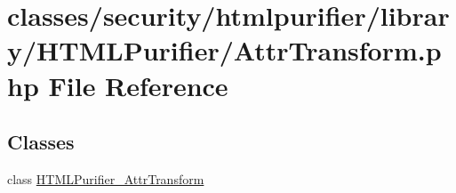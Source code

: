 \hypertarget{AttrTransform_8php}{\section{classes/security/htmlpurifier/library/\+H\+T\+M\+L\+Purifier/\+Attr\+Transform.php File Reference}
\label{AttrTransform_8php}
}
\subsection*{Classes}
\begin{DoxyCompactItemize}
\item 
class \hyperlink{classHTMLPurifier__AttrTransform}{H\+T\+M\+L\+Purifier\+\_\+\+Attr\+Transform}
\end{DoxyCompactItemize}
